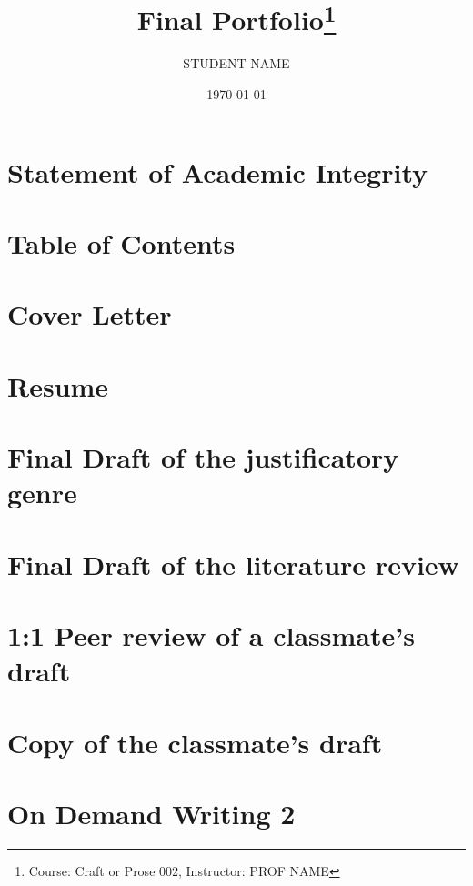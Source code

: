 \documentclass{article}
\title{Final Portfolio\thanks{Course: Craft or Prose 002, Instructor: PROF NAME}}
\author{STUDENT NAME }
\date{\today}
\begin{document}
\maketitle
\newpage

\section{Statement of Academic Integrity}


\newpage

\section{Table of Contents}
\tableofcontents
\newpage

\section{Cover Letter}


\newpage

\section{Resume}


\newpage

\section{Final Draft of the justificatory genre}


\newpage

\section{Final Draft of the literature review}


\newpage

\section{1:1 Peer review of a classmate's draft}


\newpage

\section{Copy of the classmate's draft}


\newpage

\section{On Demand Writing 2}


\newpage
\end{document}
